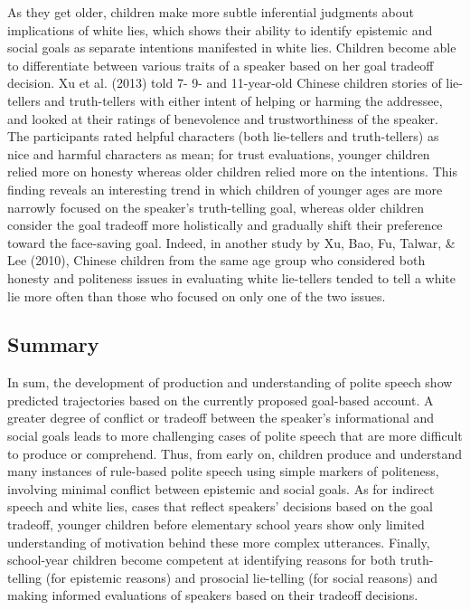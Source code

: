 \documentclass[oneside]{report}
\begin{document}
As they get older, children make more subtle inferential judgments about
implications of white lies, which shows their ability to identify
epistemic and social goals as separate intentions manifested in white
lies. Children become able to differentiate between various traits of a
speaker based on her goal tradeoff decision. Xu et al. (2013) told 7- 9-
and 11-year-old Chinese children stories of lie-tellers and
truth-tellers with either intent of helping or harming the addressee,
and looked at their ratings of benevolence and trustworthiness of the
speaker. The participants rated helpful characters (both lie-tellers and
truth-tellers) as nice and harmful characters as mean; for trust
evaluations, younger children relied more on honesty whereas older
children relied more on the intentions. This finding reveals an
interesting trend in which children of younger ages are more narrowly
focused on the speaker's truth-telling goal, whereas older children
consider the goal tradeoff more holistically and gradually shift their
preference toward the face-saving goal. Indeed, in another study by Xu,
Bao, Fu, Talwar, \& Lee (2010), Chinese children from the same age group
who considered both honesty and politeness issues in evaluating white
lie-tellers tended to tell a white lie more often than those who focused
on only one of the two issues.

\subsection{Summary}\label{summary}

In sum, the development of production and understanding of polite speech
show predicted trajectories based on the currently proposed goal-based
account. A greater degree of conflict or tradeoff between the speaker's
informational and social goals leads to more challenging cases of polite
speech that are more difficult to produce or comprehend. Thus, from
early on, children produce and understand many instances of rule-based
polite speech using simple markers of politeness, involving minimal
conflict between epistemic and social goals. As for indirect speech and
white lies, cases that reflect speakers' decisions based on the goal
tradeoff, younger children before elementary school years show only
limited understanding of motivation behind these more complex
utterances. Finally, school-year children become competent at
identifying reasons for both truth-telling (for epistemic reasons) and
prosocial lie-telling (for social reasons) and making informed
evaluations of speakers based on their tradeoff decisions.
\end{document}
